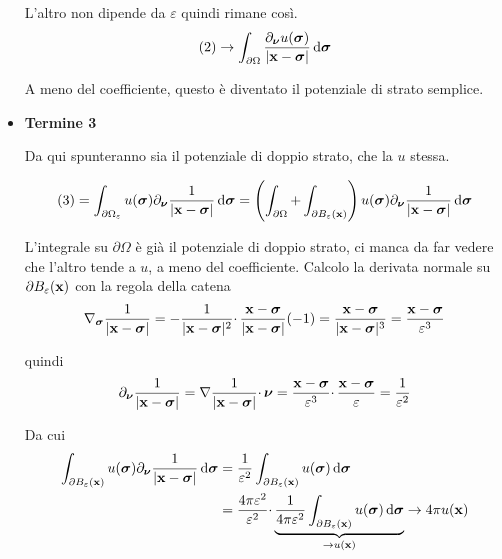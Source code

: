 \begin{dimostrazione}
\begin{itemize}
              L'altro non dipende da $\displaystyle \varepsilon $ quindi rimane così.
              \begin{equation*}
                  (2)\rightarrow \int _{\partial \Omega }\frac{\partial _{\bm{\nu}} u(\bm{\sigma})}{| \mathbf{x} -\bm{\sigma}| } \,\mathrm d \bm{\sigma}
              \end{equation*}

              A meno del coefficiente, questo è diventato il potenziale di strato semplice.
        \item \textbf{Termine 3}

              Da qui spunteranno sia il potenziale di doppio strato, che la $u$ stessa.

              \begin{equation*}
                  (3) =\int _{\partial \Omega _{\varepsilon }} u(\bm{\sigma}) \partial _{\bm{\nu}}\frac{1}{| \mathbf{x} -\bm{\sigma}| } \,\mathrm d \bm{\sigma} =\left(\int _{\partial \Omega } +\int _{\partial B_{\varepsilon }(\mathbf{x})}\right) u(\bm{\sigma}) \partial _{\bm{\nu}}\frac{1}{| \mathbf{x} -\bm{\sigma}| } \,\mathrm d \bm{\sigma}
              \end{equation*}

              L'integrale su $\displaystyle \partial \Omega $ è già il potenziale di doppio strato, ci manca da far vedere che l'altro tende a $u$, a meno del coefficiente. Calcolo la derivata normale su $\displaystyle \partial B_{\varepsilon }(\mathbf{x})$ con la regola della catena
              \begin{equation*}
                  \nabla _{\bm{\sigma}}\frac{1}{| \mathbf{x} -\bm{\sigma}| } =-\frac{1}{| \mathbf{x} -\bm{\sigma}| ^{2}} \cdotp \frac{\mathbf{x} -\bm{\sigma}}{| \mathbf{x} -\bm{\sigma}| }(-1) =\frac{\mathbf{x} -\bm{\sigma}}{| \mathbf{x} -\bm{\sigma}| ^{3}} =\frac{\mathbf{x} -\bm{\sigma}}{\varepsilon ^{3}}
              \end{equation*}

              quindi
              \begin{equation*}
                  \partial _{\bm{\nu}}\frac{1}{| \mathbf{x} -\bm{\sigma}| } =\nabla \frac{1}{| \mathbf{x} -\bm{\sigma}| } \cdotp \bm{\nu} =\frac{\mathbf{x} -\bm{\sigma}}{\varepsilon ^{3}} \cdotp \frac{\mathbf{x} -\bm{\sigma}}{\varepsilon } =\frac{1}{\varepsilon ^{2}}
              \end{equation*}

              Da cui
              \begin{align*}
                  \int _{\partial B_{\varepsilon }(\mathbf{x})} u(\bm{\sigma}) \partial _{\bm{\nu}}\frac{1}{| \mathbf{x} -\bm{\sigma}| } \,\mathrm d \bm{\sigma} & =\frac{1}{\varepsilon ^{2}}\int _{\partial B_{\varepsilon }(\mathbf{x})} u(\bm{\sigma}) \,\mathrm d \bm{\sigma}                                                                                                                   \\
                                                                                                               & =\frac{4\pi \varepsilon ^{2}}{\varepsilon ^{2}} \cdotp \underbrace{\frac{1}{4\pi \varepsilon ^{2}}\int _{\partial B_{\varepsilon }(\mathbf{x})} u(\bm{\sigma}) \,\mathrm d \bm{\sigma}}_{\rightarrow u(\mathbf{x})}\rightarrow 4\pi u(\mathbf{x})
              \end{align*}


\end{itemize}
\end{dimostrazione}
